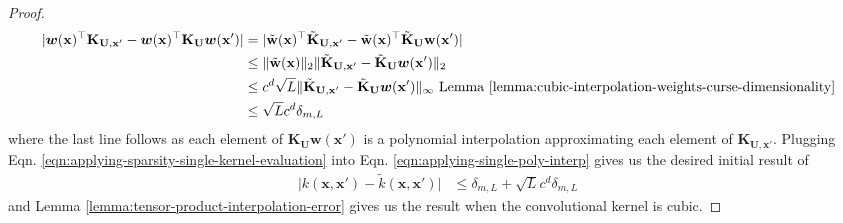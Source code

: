 \begin{proof}
\begin{align}
    \vert \boldsymbol{w}(\mathbf{x})^\top \textbf{K}_{\textbf{U},\textbf{x}'}-\boldsymbol{w}(\mathbf{x})^\top \mathbf{K}_{\textbf{U}} \boldsymbol{w}(\mathbf{x}')\vert&=\vert \tilde{\textbf{w}}(\textbf{x})^\top \tilde{\textbf{K}}_{\textbf{U},\textbf{x}'}-\tilde{\textbf{w}}(\textbf{x})^\top \tilde{\textbf{K}}_\textbf{U}\textbf{w}(\textbf{x}')\vert\nonumber\\
    &\leq \Vert \tilde{\textbf{w}}(\textbf{x})\Vert_2\Vert \tilde{\textbf{K}}_{\textbf{U},\textbf{x}'}-\tilde{\mathbf{K}}_{\textbf{U}} \boldsymbol{w}(\mathbf{x}')\Vert_2\nonumber\\
    &\leq c^d\sqrt{L}\Vert \tilde{\textbf{K}}_{\textbf{U},\textbf{x}'}-\tilde{\mathbf{K}}_{\textbf{U}} \boldsymbol{w}(\mathbf{x}')\Vert_\infty\nonumber\text{ Lemma \ref{lemma:cubic-interpolation-weights-curse-dimensionality}}\\
    &\leq \sqrt{L}c^d\delta_{m,L}\label{eqn:applying-sparsity-single-kernel-evaluation}
\end{align}
where the last line follows as each element of $\mathbf{K}_{\textbf{U}} \boldsymbol{w}(\mathbf{x}')$ is a polynomial interpolation approximating each element of $\textbf{K}_{\textbf{U},\textbf{x}'}$. Plugging Eqn. \ref{eqn:applying-sparsity-single-kernel-evaluation} into Eqn. \ref{eqn:applying-single-poly-interp} gives us the desired initial result of
\begin{align*}
    \vert k(\textbf{x},\textbf{x}')-\tilde{k}(\textbf{x},\textbf{x}')\vert&\leq \delta_{m,L}+\sqrt{L}c^d\delta_{m,L}
\end{align*}
and Lemma \ref{lemma:tensor-product-interpolation-error} gives us the result when the convolutional kernel is cubic.
\end{proof}
